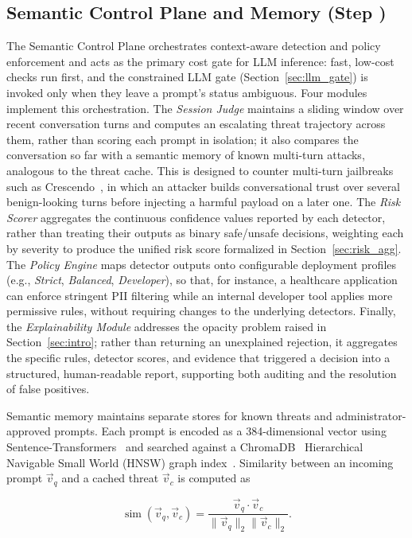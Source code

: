 \documentclass[runningheads]{llncs}
\newif\ifrev
\newcommand{\rev}[1]{\ifrev\hl{#1}\else#1\fi}                  %
\begin{document}
\subsection{Semantic Control Plane and Memory (Step )}
The Semantic Control Plane orchestrates context-aware detection and policy enforcement and acts as the primary cost gate for LLM inference: fast, low-cost checks run first, and the constrained LLM gate (Section~\ref{sec:llm_gate}) is invoked only when they leave a prompt's status ambiguous. Four modules implement this orchestration. The \emph{Session Judge} maintains a sliding window over recent conversation turns and computes an escalating threat trajectory across them, rather than scoring each prompt in isolation\rev{; it also compares the conversation so far with a semantic memory of known multi-turn attacks, analogous to the threat cache}. This is designed to counter multi-turn jailbreaks such as Crescendo~\cite{russinovich2024crescendo}, in which an attacker builds conversational trust over several benign-looking turns before injecting a harmful payload on a later one. The \emph{Risk Scorer} aggregates the continuous confidence values reported by each detector, rather than treating their outputs as binary safe/unsafe decisions, weighting each by severity to produce the unified risk score formalized in Section~\ref{sec:risk_agg}. The \emph{Policy Engine} maps \rev{detector outputs} onto configurable deployment profiles (e.g., \textit{Strict}, \textit{Balanced}, \textit{Developer}), so that, for instance, a healthcare application can enforce stringent PII filtering while an internal developer tool applies more permissive rules, without requiring changes to the underlying detectors. Finally, the \emph{Explainability Module} addresses the opacity problem raised in Section~\ref{sec:intro}; rather than returning an unexplained rejection, it aggregates the specific rules, detector scores, and evidence that triggered a decision into a structured, human-readable report, supporting both auditing and the resolution of false positives.

Semantic memory maintains separate stores for known threats and
administrator-approved prompts. Each prompt is encoded as a
384-dimensional vector using Sentence-Transformers~\cite{reimers2019sbert} and searched against a ChromaDB~\cite{chromadb} Hierarchical Navigable Small World (HNSW) graph
index~\cite{malkov2020hnsw}. Similarity between an incoming prompt
$\vec{v}_q$ and a cached threat $\vec{v}_c$ is computed as

\begin{equation}
\operatorname{sim}(\vec{v}_q,\vec{v}_c)=
\frac{\vec{v}_q\cdot\vec{v}_c}
{\|\vec{v}_q\|_2\|\vec{v}_c\|_2}.
\label{eq:cosine}
\end{equation}
\end{document}
